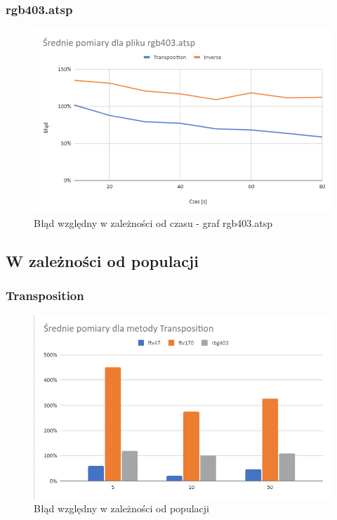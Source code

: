 \documentclass{article}
\begin{document}
\subsubsection{rgb403.atsp}
\begin{figure}[h!]
\centering
\includegraphics[width=\textwidth]{img/403.png}
\caption{Błąd względny w zależności od czasu - graf rgb403.atsp}
\end{figure}

\newpage
\subsection{W zależności od populacji}
\subsubsection{Transposition}
\begin{figure}[h!]
\centering
\includegraphics[width=\textwidth]{img/trans.png}
\caption{Błąd względny w zależności od populacji}
\end{figure}
\newpage
\end{document}
